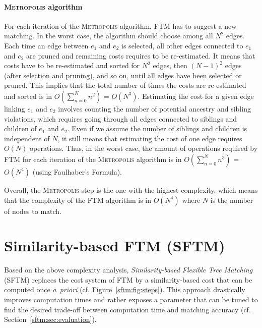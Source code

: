 \paragraph{\textsc{Metropolis} algorithm}
For each iteration of the \textsc{Metropolis} algorithm, FTM has to suggest a new matching.
In the worst case, the algorithm should choose among all $N^2$ edges.
Each time an edge between $e_1$ and $e_2$ is selected, all other edges connected to $e_1$ and $e_2$ are pruned and remaining costs requires to be re-estimated.
It means that costs have to be re-estimated and sorted for $N^2$ edges, then $(N-1)^2$ edges (after selection and pruning), and so on, until all edges have been selected or pruned.
This implies that the total number of times the costs are re-estimated and sorted is in $O(\sum^N_{n = 0}n^2)$ = $O(N^3)$.
Estimating the cost for a given edge linking $e_1$ and $e_2$ involves counting the number of potential ancestry and sibling violations, which requires going through all edges connected to siblings and children of $e_1$ and $e_2$.
Even if we assume the number of siblings and children is independent of $N$, it still means that estimating the cost of one edge requires $O(N)$ operations.
Thus, in the worst case, the amount of operations required by FTM for each iteration of the \textsc{Metropolis} algorithm is in $O(\sum^N_{n = 0}n^3)$ = $O(N^4)$ (using Faulhaber's Formula).

Overall, the \textsc{Metropolis} step is the one with the highest complexity, which means that the complexity of the FTM algorithm is in $O(N^4)$ where $N$ is the number of nodes to match.

\section{Similarity-based FTM (SFTM)}\label{sftm:sec:SFTM}
Based on the above complexity analysis, \emph{Similarity-based Flexible Tree Matching} (SFTM) replaces the cost system of FTM by a similarity-based cost that can be computed once \textit{a~priori} (cf. Figure~\ref{sftm:fig:steps}).
This approach drastically improves computation times and rather exposes a parameter that can be tuned to find the desired trade-off between computation time and matching accuracy (cf. Section~\ref{sftm:sec:evaluation}).

